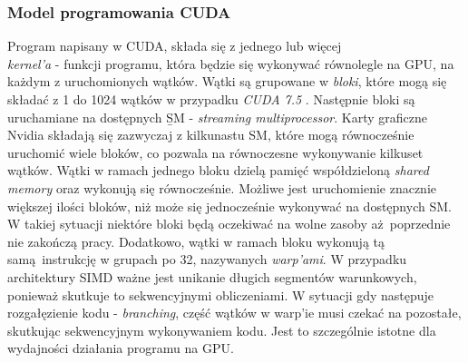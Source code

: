 \subsubsection{Model programowania CUDA}
Program napisany w CUDA, składa się z jednego lub więcej  \\
\textit{kernel'a} - funkcji programu, która będzie się wykonywać równolegle na GPU, na każdym z uruchomionych wątków.
Wątki są grupowane w \textit{bloki}, które mogą się składać z 1 do 1024 wątków w przypadku \textit{CUDA 7.5} \cite{CudaDeveloper}.
Następnie bloki są uruchamiane na dostępnych \b{SM} - \textit{streaming multiprocessor}.
Karty graficzne Nvidia składają się zazwyczaj z kilkunastu SM, które mogą równocześnie uruchomić wiele
bloków, co pozwala na równoczesne wykonywanie kilkuset wątków.
Wątki w ramach jednego bloku dzielą pamięć współdzieloną \textit{shared memory} oraz wykonują się równocześnie.
Możliwe jest uruchomienie znacznie większej ilości bloków, niż może się jednocześnie wykonywać na dostępnych SM.
W takiej sytuacji niektóre bloki będą oczekiwać na wolne zasoby aż poprzednie nie zakończą pracy.
Dodatkowo, wątki w ramach bloku wykonują tą samą instrukcję w grupach po 32,
nazywanych \textit{warp'ami}.
W przypadku architektury SIMD ważne jest unikanie długich segmentów
warunkowych, ponieważ skutkuje to sekwencyjnymi obliczeniami.
W sytuacji gdy następuje rozgałęzienie kodu - \textit{branching},
część wątków w warp'ie musi czekać na pozostałe, skutkując sekwencyjnym wykonywaniem kodu.
Jest to szczególnie istotne dla wydajności działania programu na GPU.
